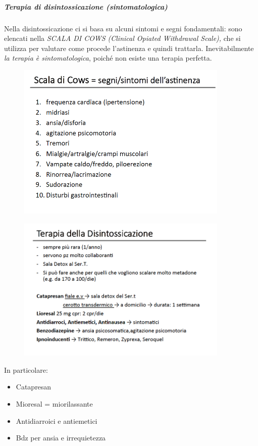 \subparagraph{Terapia di disintossicazione (sintomatologica)}

Nella disintossicazione ci si basa su alcuni sintomi e segni
fondamentali: sono elencati nella \emph{SCALA DI COWS (Clinical Opiated
Withdrawal Scale),} che si utilizza per valutare come procede
l'astinenza e quindi trattarla. Inevitabilmente \emph{la terapia è
sintomatologica}, poiché non esiste una terapia perfetta.

\begin{figure}[!ht]
\centering
	\includegraphics[width=0.9\textwidth]{017/image12.png}
\end{figure}

\begin{figure}[!ht]
\centering
	\includegraphics[width=0.9\textwidth]{017/image13.png}
\end{figure}

In particolare:

\begin{itemize}
\item
  Catapresan
\item
  Mioresal = miorilassante
\item
Antidiarroici e antiemetici
\item
 Bdz per ansia e irrequietezza
\end{itemize}

